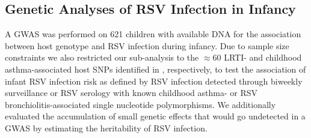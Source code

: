 \documentclass{article} %
\begin{document}
\subsection{Genetic Analyses of RSV Infection in Infancy}
A GWAS was performed on 621 children with available DNA for the association between host genotype and RSV infection during infancy.
Due to sample size constraints we also restricted our sub-analysis to the $\approx 60$ LRTI- and childhood asthma-associated host SNPs identified in 
\citet{pividori2019shared, janssen2007genetic, pasanen2017genome}, 
respectively, to test the association of infant RSV infection risk as defined by RSV infection detected through biweekly surveillance or RSV serology with known childhood asthma- or RSV bronchiolitis-associated single nucleotide polymorphisms.
We additionally evaluated the accumulation of small genetic effects that would go undetected in a GWAS by estimating the heritability of RSV infection. 
\end{document}
